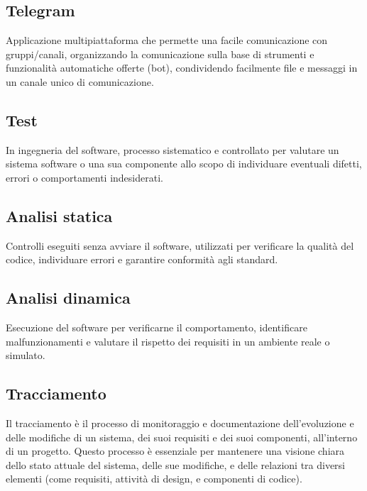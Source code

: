 \newpage



\section{}

\hypertarget{sec:telegram}{}
\subsection*{Telegram}
Applicazione multipiattaforma che permette una facile comunicazione con gruppi/canali, organizzando la comunicazione sulla base di strumenti e 
funzionalità automatiche offerte (bot), condividendo facilmente file e messaggi in un canale unico di comunicazione.

\hypertarget{sec:test}{}
\subsection*{Test}
In ingegneria del software, processo sistematico e controllato per valutare un sistema software o una sua componente allo scopo di individuare eventuali 
difetti, errori o comportamenti indesiderati.

\hypertarget{sec:analisi_statica}{}
\subsection*{Analisi statica}
Controlli eseguiti senza avviare il software, utilizzati per verificare la qualità del codice, individuare errori e garantire conformità agli standard.

\hypertarget{sec:analisi_dinamica}{}
\subsection*{Analisi dinamica}
Esecuzione del software per verificarne il comportamento, identificare malfunzionamenti e valutare il rispetto dei requisiti in un ambiente reale o simulato.

\subsection*{Tracciamento}
Il tracciamento è il processo di monitoraggio e documentazione dell'evoluzione e delle modifiche di un sistema, dei suoi requisiti e dei suoi componenti, 
all’interno di un progetto. Questo processo è essenziale per mantenere una visione chiara dello stato attuale del sistema, delle sue modifiche, e delle 
relazioni tra diversi elementi (come requisiti, attività di design, e componenti di codice).

